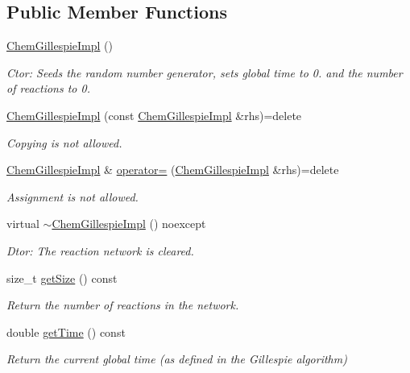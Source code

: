 \subsection*{Public Member Functions}
\begin{DoxyCompactItemize}
\item 
\hyperlink{classChemGillespieImpl_a262281b68b8fdd026a8d28f57315b13d}{Chem\+Gillespie\+Impl} ()
\begin{DoxyCompactList}\small\item\em Ctor\+: Seeds the random number generator, sets global time to 0. and the number of reactions to 0. \end{DoxyCompactList}\item 
\hyperlink{classChemGillespieImpl_aa492ec3985b18a49352c47d8d12c3647}{Chem\+Gillespie\+Impl} (const \hyperlink{classChemGillespieImpl}{Chem\+Gillespie\+Impl} \&rhs)=delete
\begin{DoxyCompactList}\small\item\em Copying is not allowed. \end{DoxyCompactList}\item 
\hyperlink{classChemGillespieImpl}{Chem\+Gillespie\+Impl} \& \hyperlink{classChemGillespieImpl_a1c0c24205d43a0f70be04ead713d18f9}{operator=} (\hyperlink{classChemGillespieImpl}{Chem\+Gillespie\+Impl} \&rhs)=delete
\begin{DoxyCompactList}\small\item\em Assignment is not allowed. \end{DoxyCompactList}\item 
virtual \hyperlink{classChemGillespieImpl_a56b73cf9e60b5ebd9ead82d4b6dd1b1a}{$\sim$\+Chem\+Gillespie\+Impl} () noexcept
\begin{DoxyCompactList}\small\item\em Dtor\+: The reaction network is cleared. \end{DoxyCompactList}\item 
size\+\_\+t \hyperlink{classChemGillespieImpl_a8deb307599919a7a2f8d597245761fdd}{get\+Size} () const 
\begin{DoxyCompactList}\small\item\em Return the number of reactions in the network. \end{DoxyCompactList}\item 
double \hyperlink{classChemGillespieImpl_a8295735915237bae30d18cd6c31c058a}{get\+Time} () const 
\begin{DoxyCompactList}\small\item\em Return the current global time (as defined in the Gillespie algorithm) \end{DoxyCompactList}\item 

\end{DoxyCompactItemize}
